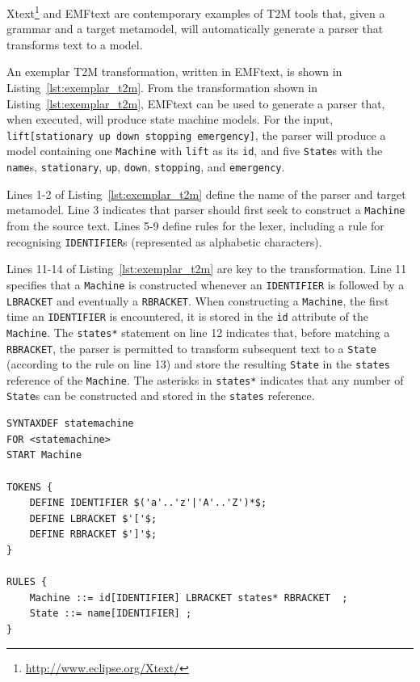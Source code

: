 Xtext\footnote{\url{http://www.eclipse.org/Xtext/}} and EMFtext \cite{heidenreich09derivation} are contemporary examples of T2M tools that, given a grammar and a target metamodel, will automatically generate a parser that transforms text to a model.

An exemplar T2M transformation, written in EMFtext, is shown in Listing~\ref{lst:exemplar_t2m}. From the transformation shown in Listing~\ref{lst:exemplar_t2m}, EMFtext can be used to generate a parser that, when executed, will produce state machine models. For the input, \texttt{lift[stationary up down stopping emergency]}, the pa\-rser will produce a model containing one \texttt{Machine} with \texttt{lift} as its \texttt{id}, and five \texttt{State}s with the \texttt{name}s, \texttt{stationary}, \texttt{up}, \texttt{down}, \texttt{stopping}, and \texttt{em\-er\-ge\-ncy}.

Lines 1-2 of Listing~\ref{lst:exemplar_t2m} define the name of the parser and target metamodel. Line 3 indicates that parser should first seek to construct a \texttt{Machine} from the source text. Lines 5-9 define rules for the lexer, including a rule for recognising \texttt{IDENTIFIER}s (represented as alphabetic characters).

Lines 11-14 of Listing~\ref{lst:exemplar_t2m} are key to the transformation. Line 11 specifies that a \texttt{Machine} is constructed whenever an \texttt{IDENTIFIER} is followed by a \texttt{LBRACKET} and eventually a \texttt{RBRACKET}. When constructing a \texttt{Machine}, the first time an \texttt{IDENTIFIER} is encountered, it is stored in the \texttt{id} attribute of the \texttt{Machine}. The \texttt{states*} statement on line 12 indicates that, before matching a \texttt{RBRACKET}, the parser is permitted to transform subsequent text to a \texttt{State} (according to the rule on line 13) and store the resulting \texttt{State} in the \texttt{states} reference of the \texttt{Machine}. The asterisks in \texttt{states*} indicates that any number of \texttt{State}s can be constructed and stored in the \texttt{states} reference.

\begin{lstlisting}[caption=T2M transformation in EMFtext, label=lst:exemplar_t2m, language=EMFtext]
SYNTAXDEF statemachine
FOR <statemachine>
START Machine

TOKENS {
	DEFINE IDENTIFIER $('a'..'z'|'A'..'Z')*$;
	DEFINE LBRACKET $'['$;
	DEFINE RBRACKET $']'$;
}

RULES {
	Machine ::= id[IDENTIFIER] LBRACKET states* RBRACKET  ;
	State ::= name[IDENTIFIER] ;
}
\end{lstlisting}

